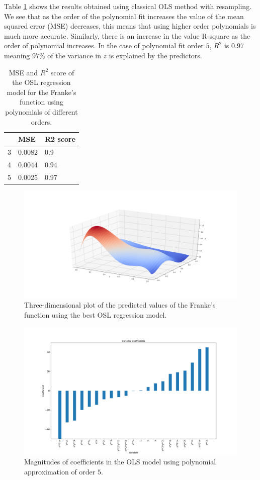 \documentclass [11pt]{article}
\begin{document}
Table \ref{tab:olsFranke} shows the results obtained using classical OLS method with resampling. We see that as the order of the polynomial fit increases the value of  the mean squared error (MSE) decreases, this means that using higher order polynomials is much more accurate. Similarly, there is an increase in the value R-square as the order of polynomial increases. In the case of polynomial fit order $5$, $R^{2}$ is $0.97$ meaning $97\%$ of the variance in $z$ is explained by the predictors. 

\begin{table}[H]
\centering
\begin{tabular}{lll}
\hline
  & MSE    & R2 score \\ \hline
3 & 0.0082 & 0.9      \\
4 & 0.0044 & 0.94     \\
5 & 0.0025 & 0.97     \\ \hline
\end{tabular}
\caption{MSE and $R^{2}$ score of the OSL regression model for the Franke's function using polynomials of different orders.}
\label{tab:olsFranke}
\end{table}
 
\begin{figure}[H]
\centering
\includegraphics[width=1\textwidth]{figures/olsFranke.png}
        \caption{Three-dimensional plot of the predicted values of the Franke’s function using the best OSL regression model.}
        \label{fig:olsFranke}
\end{figure}

\begin{figure}[H]
\centering
\includegraphics[width=1\textwidth]{figures/coeffOLS.png}
        \caption{Magnitudes of coefficients in the OLS model using polynomial approximation of order $5$.}
        \label{fig:coeffOLS}
\end{figure}
\end{document}
